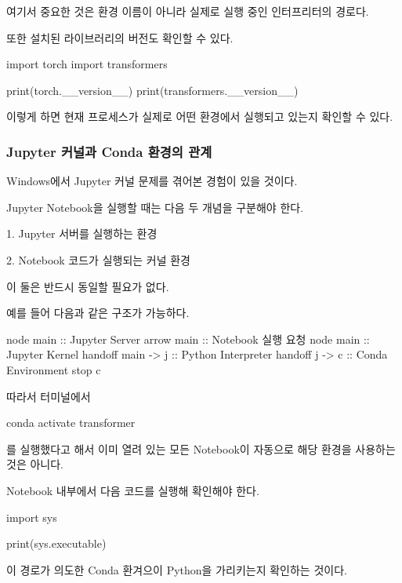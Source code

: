 여기서 중요한 것은 환경 이름이 아니라 실제로 실행 중인 인터프리터의 경로다.

또한 설치된 라이브러리의 버전도 확인할 수 있다.

\begin{dhkcode}
import torch
import transformers

print(torch.__version__)
print(transformers.__version__)
\end{dhkcode}

이렇게 하면 현재 프로세스가 실제로 어떤 환경에서 실행되고 있는지 확인할 수 있다.

\subsubsection{Jupyter 커널과 Conda 환경의 관계}

Windows에서 Jupyter 커널 문제를 겪어본 경험이 있을 것이다.

Jupyter Notebook을 실행할 때는 다음 두 개념을 구분해야 한다.

\begin{dhksmry}
    1. Jupyter 서버를 실행하는 환경

    2. Notebook 코드가 실행되는 커널 환경
\end{dhksmry}

이 둘은 반드시 동일할 필요가 없다.

예를 들어 다음과 같은 구조가 가능하다.

\begin{dhkbranch}[in=8]
node main :: Jupyter Server
arrow main :: Notebook 실행 요청
node main :: Jupyter Kernel
handoff main -> j :: Python Interpreter
handoff j -> c :: Conda Environment
stop c
\end{dhkbranch}

따라서 터미널에서

\begin{dhkzsh}
conda activate transformer
\end{dhkzsh}

를 실행했다고 해서 이미 열려 있는 모든 Notebook이 자동으로 해당 환경을 사용하는 것은 아니다.

Notebook 내부에서 다음 코드를 실행해 확인해야 한다.

\begin{dhkcode}
import sys

print(sys.executable)
\end{dhkcode}

이 경로가 의도한 Conda 환겨으이 Python을 가리키는지 확인하는 것이다.

